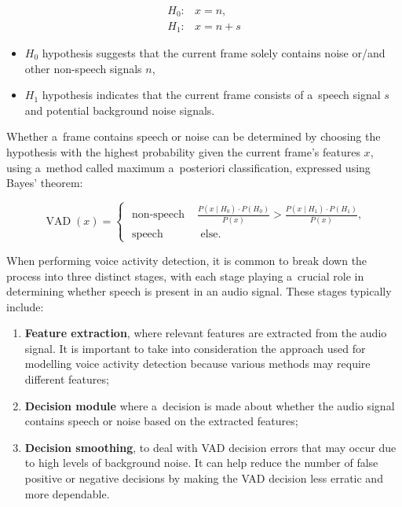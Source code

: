 \begin{equation}\label{VADhypotheses}
    \begin{array}{ll}
    H_0: & x=n, \\
    H_1: & x=n+s
    \end{array}
\end{equation}

\begin{itemize}
    \item $H_0$ hypothesis suggests that the current frame solely contains noise or/and other non-speech signals $n$,
    \item $H_1$ hypothesis indicates that the current frame consists of a~speech signal $s$ and potential background noise signals.
\end{itemize}

Whether a~frame contains speech or noise can be determined by choosing the hypothesis with the highest probability given the current frame's features $x$, using a~method called maximum a~posteriori classification, expressed using Bayes' theorem:

$$
\operatorname{VAD}\left(x\right)= 
    \begin{cases}
        \text { non-speech } & \frac{P\left(x \mid H_0\right) \cdot P(H_0)}{P(x)}>\frac{P\left(x \mid H_1\right) \cdot P(H_1)}{P(x)} \text{,} \\ 
        \text { speech } & \text { else. }
    \end{cases}
$$

When performing voice activity detection, it is common to break down the process into three distinct stages, with each stage playing a~crucial role in determining whether speech is present in an audio signal. These stages typically include:

\begin{enumerate}
    \item \textbf{Feature extraction}, where relevant features are extracted from the audio signal. It is important to take into consideration the approach used for modelling voice activity detection because various methods may require different features;
    \item \textbf{Decision module} where a~decision is made about whether the audio signal contains speech or noise based on the extracted features;
    \item \textbf{Decision smoothing}, to deal with VAD decision errors that may occur due to high levels of background noise. It can help reduce the number of false positive or negative decisions by making the VAD decision less erratic and more dependable.
\end{enumerate}

